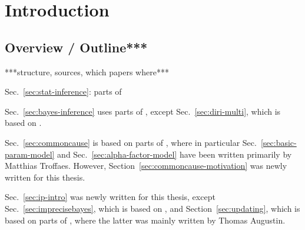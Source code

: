 \chapter{Introduction}
\label{cha:intro}


\section{Overview / Outline***}

***structure, sources, which papers where***

Sec.~\ref{sec:stat-inference}: parts of \textcite[\S\S 1.1, 1.2, 1.5]{itip-statinf}

Sec.~\ref{sec:bayes-inference} uses parts of \textcite[\S\S 1.3, 1.4, 4.1]{itip-statinf},
except Sec.~\ref{sec:diri-multi}, which is based on \textcite{Walter2012b}.



Sec.~\ref{sec:commoncause} is based on parts of \textcite{Troffaes2013a},
where in particular Sec.~\ref{sec:basic-param-model} and Sec.~\ref{sec:alpha-factor-model}
have been written primarily by Matthias Troffaes.
However, Section~\ref{sec:commoncause-motivation} was newly written for this thesis.


Sec.~\ref{sec:ip-intro} was newly written for this thesis,
except Sec.~\ref{sec:imprecisebayes}, which is based on \textcite[\S 4.2]{itip-statinf},
and Section~\ref{sec:updating}, which is based on parts of \textcite[\S 4.4]{itip-statinf},
where the latter was mainly written by Thomas Augustin.

